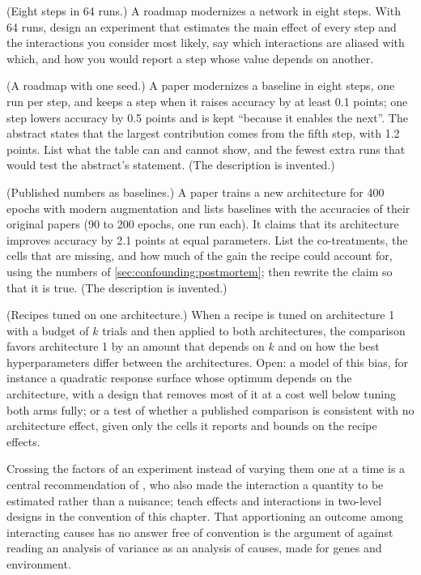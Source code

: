 \begin{refsection}
\begin{exercises}
\item \design (Eight steps in 64 runs.) A roadmap modernizes a network in eight steps. With 64 runs, design an experiment that estimates the main effect of every step and the interactions you consider most likely, say which interactions are aliased with which, and how you would report a step whose value depends on another. \label{ex:confounding:roadmap}

\item \critique (A roadmap with one seed.) A paper modernizes a baseline in eight steps, one run per step, and keeps a step when it raises accuracy by at least 0.1 points; one step lowers accuracy by 0.5 points and is kept \enquote{because it enables the next}. The abstract states that the largest contribution comes from the fifth step, with 1.2 points. List what the table can and cannot show, and the fewest extra runs that would test the abstract's statement. (The description is invented.)\label{ex:confounding:critique1}

\item \critique (Published numbers as baselines.) A paper trains a new architecture for 400 epochs with modern augmentation and lists baselines with the accuracies of their original papers (90 to 200 epochs, one run each). It claims that its architecture improves accuracy by 2.1 points at equal parameters. List the co-treatments, the cells that are missing, and how much of the gain the recipe could account for, using the numbers of \cref{sec:confounding:postmortem}; then rewrite the claim so that it is true. (The description is invented.)\label{ex:confounding:critique2}

\item \research (Recipes tuned on one architecture.) When a recipe is tuned on architecture 1 with a budget of $k$ trials and then applied to both architectures, the comparison favors architecture 1 by an amount that depends on $k$ and on how the best hyperparameters differ between the architectures. Open: a model of this bias, for instance a quadratic response surface whose optimum depends on the architecture, with a design that removes most of it at a cost well below tuning both arms fully; or a test of whether a published comparison is consistent with no architecture effect, given only the cells it reports and bounds on the recipe effects.\label{ex:confounding:research}
\end{exercises}

\notesandrefs
Crossing the factors of an experiment instead of varying them one at a time is a central recommendation of \textcite{Fisher1935}, who also made the interaction a quantity to be estimated rather than a nuisance; \textcite{BoxHunterHunter2005} teach effects and interactions in two-level designs in the convention of this chapter. That apportioning an outcome among interacting causes has no answer free of convention is the argument of \textcite{Lewontin1974} against reading an analysis of variance as an analysis of causes, made for genes and environment.


\end{refsection}
